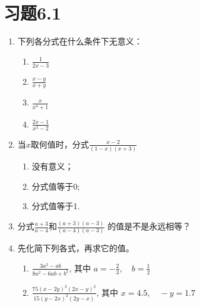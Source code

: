 \section*{习题6.1}
\begin{enumerate}
    \item 下列各分式在什么条件下无意义：
 \begin{multicols}{2}
 \begin{enumerate}
     \item $\frac{1}{2x-3}$
     \item $\frac{x-y}{x+y}$
     \item $\frac{x}{x^4+1}$
     \item $\frac{2x-1}{x^2-2}$
 \end{enumerate}
 \end{multicols}
    \item 当$x$取何值时，分式$\frac{x-2}{(1-x)(x+3)}$
    \begin{enumerate}
        \item 没有意义；
        \item 分式值等于0;
        \item 分式值等于1.
    \end{enumerate}
\item 分式$\frac{a+3}{a-4}$和$\frac{(a+3)(a-3)}{(a-4)(a-3)}$
的值是不是永远相等？
\item 先化简下列各式，再求它的值。
\begin{enumerate}
    \item $\frac{3 a^{2}-a b}{8 a^{2}-6 a b+b^{2}}$, 其中 $a=- \frac{2}{3}, \quad b=\frac{1}{2}$
    \item  $\frac{75(x-2 y)^{3}(2 x-y)^{2}}{15(y-2 x)^{2}(2 y-x)}$, 其中 $x=4.5,\quad -y=1.7$
\end{enumerate}


\end{enumerate}
